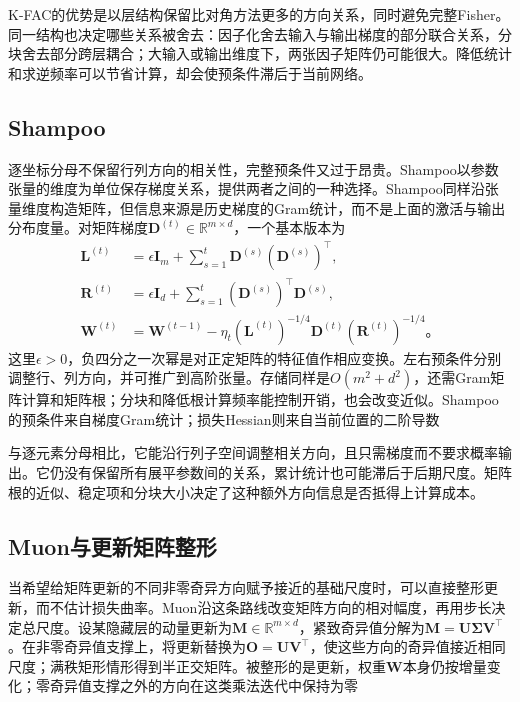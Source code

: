 K-FAC的优势是以层结构保留比对角方法更多的方向关系，同时避免完整Fisher。同一结构也决定哪些关系被舍去：因子化舍去输入与输出梯度的部分联合关系，分块舍去部分跨层耦合；大输入或输出维度下，两张因子矩阵仍可能很大。降低统计和求逆频率可以节省计算，却会使预条件滞后于当前网络。

\subsection{Shampoo}
\label{sec:training-shampoo}

逐坐标分母不保留行列方向的相关性，完整预条件又过于昂贵。Shampoo以参数张量的维度为单位保存梯度关系，提供两者之间的一种选择。Shampoo同样沿张量维度构造矩阵，但信息来源是历史梯度的Gram统计，而不是上面的激活与输出分布度量。对矩阵梯度$\bm D^{(t)}\in\mathbb R^{m\times d}$，一个基本版本为
\begin{align}
  \bm L^{(t)}&=\epsilon\bm I_m+\sum_{s=1}^t\bm D^{(s)}(\bm D^{(s)})^{\top},\\
  \bm R^{(t)}&=\epsilon\bm I_d+\sum_{s=1}^t(\bm D^{(s)})^{\top}\bm D^{(s)},\\
  \bm W^{(t)}&=\bm W^{(t-1)}-
    \eta_t(\bm L^{(t)})^{-1/4}\bm D^{(t)}(\bm R^{(t)})^{-1/4}\text{。}
  \label{eq:training-shampoo}
\end{align}
这里$\epsilon>0$，负四分之一次幂是对正定矩阵的特征值作相应变换。左右预条件分别调整行、列方向，并可推广到高阶张量。存储同样是$O(m^2+d^2)$，还需Gram矩阵计算和矩阵根；分块和降低根计算频率能控制开销，也会改变近似。Shampoo的预条件来自梯度Gram统计；损失Hessian则来自当前位置的二阶导数

与逐元素分母相比，它能沿行列子空间调整相关方向，且只需梯度而不要求概率输出。它仍没有保留所有展平参数间的关系，累计统计也可能滞后于后期尺度。矩阵根的近似、稳定项和分块大小决定了这种额外方向信息是否抵得上计算成本。

\subsection{Muon与更新矩阵整形}
\label{sec:training-muon}

当希望给矩阵更新的不同非零奇异方向赋予接近的基础尺度时，可以直接整形更新，而不估计损失曲率。Muon沿这条路线改变矩阵方向的相对幅度，再用步长决定总尺度。设某隐藏层的动量更新为$\bm M\in\mathbb R^{m\times d}$，紧致奇异值分解为$\bm M=\bm U\bm\Sigma\bm V^{\top}$。在非零奇异值支撑上，将更新替换为$\bm O=\bm U\bm V^{\top}$，使这些方向的奇异值接近相同尺度；满秩矩形情形得到半正交矩阵。被整形的是更新，权重$\bm W$本身仍按增量变化；零奇异值支撑之外的方向在这类乘法迭代中保持为零

